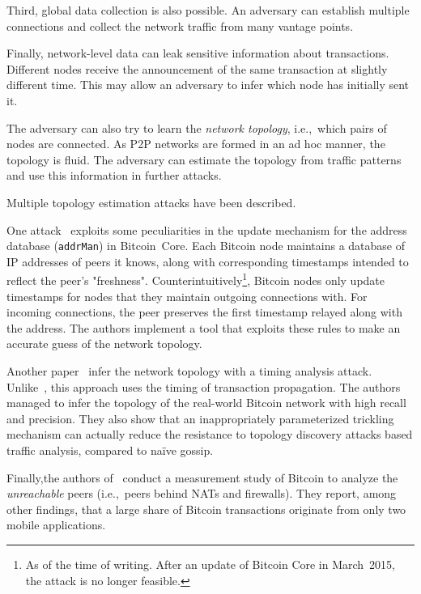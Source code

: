Third, global data collection is also possible.
An adversary can establish multiple connections and collect the network traffic from many vantage points.

Finally, network-level data can leak sensitive information about transactions.
Different nodes receive the announcement of the same transaction at slightly different time.
This may allow an adversary to infer which node has initially sent it.

The adversary can also try to learn the \textit{network topology}, i.e.,~which pairs of nodes are connected.
As P2P networks are formed in an ad hoc manner, the topology is fluid.
The adversary can estimate the topology from traffic patterns and use this information in further attacks.

Multiple topology estimation attacks have been described.

One attack~\cite{Miller2015} exploits some peculiarities in the update mechanism for the address database (\texttt{addrMan}) in Bitcoin~Core.
Each Bitcoin node maintains a database of IP addresses of peers it knows, along with corresponding timestamps intended to reflect the peer's "freshness".
Counterintuitively\footnote{As of the time of writing. After an update of Bitcoin Core in March~2015, the attack is no longer feasible.}, Bitcoin nodes only update timestamps for nodes that they maintain outgoing connections with.
For incoming connections, the peer preserves the first timestamp relayed along with the address.
The authors implement a tool that exploits these rules to make an accurate guess of the network topology.

Another paper~\cite{Neudecker2016} infer the network topology with a timing analysis attack.
Unlike~\cite{Miller2015}, this approach uses the timing of transaction propagation.
The authors managed to infer the topology of the real-world Bitcoin network with high recall and precision.
They also show that an inappropriately parameterized trickling mechanism can actually reduce the resistance to topology discovery attacks based traffic analysis, compared to na{\"i}ve gossip.

Finally,the authors of~\cite{Wang2017} conduct a measurement study of Bitcoin to analyze the \textit{unreachable} peers (i.e.,~peers behind NATs and firewalls).
They report, among other findings, that a large share of Bitcoin transactions originate from only two mobile applications.



